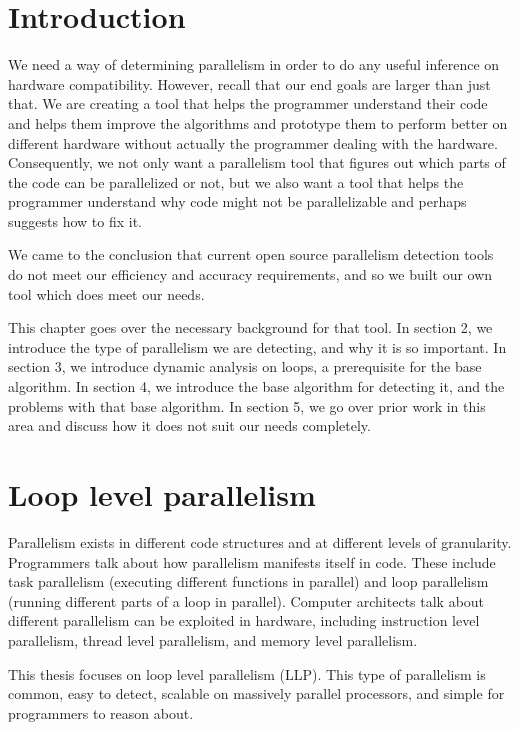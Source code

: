 \documentclass[12pt,twoside]{reedthesis}
\begin{document}
	\section{Introduction}
	
		We need a way of determining parallelism in order to do any useful inference on hardware compatibility. However, recall that our end goals are larger than just that. We are creating a tool that helps the programmer understand their code and helps them improve the algorithms and prototype them to perform better on different hardware without actually the programmer dealing with the hardware. Consequently, we not only want a parallelism tool that figures out which parts of the code can be parallelized or not, but we also want a tool that helps the programmer understand why code might not be parallelizable and perhaps suggests how to fix it. 
		 
		We came to the conclusion that current open source parallelism detection tools do not meet our efficiency and accuracy requirements, and so we built our own tool which does meet our needs. 
		
		This chapter goes over the necessary background for that tool. In section 2, we introduce the type of parallelism we are detecting, and why it is so important. In section 3, we introduce dynamic analysis on loops, a prerequisite for the base algorithm. In section 4, we introduce the base algorithm for detecting it, and the problems with that base algorithm. In section 5, we go over prior work in this area and discuss how it does not suit our needs completely. 
		
	\section{Loop level parallelism}
	
		Parallelism exists in different code structures and at different levels of granularity. Programmers talk about how parallelism manifests itself in code. These include task parallelism (executing different functions in parallel) and  loop parallelism (running different parts of a loop in parallel). Computer architects talk about different parallelism can be exploited in hardware, including instruction level parallelism, thread level parallelism, and memory level parallelism. 
		
		This thesis focuses on loop level parallelism (LLP). This type of parallelism is common, easy to detect, scalable on massively parallel processors, and simple for programmers to reason about. 
		
\end{document}
